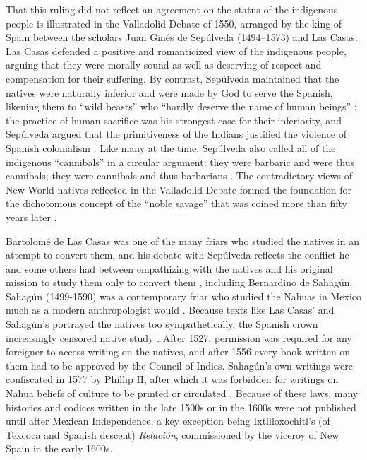 That this ruling did not reflect an agreement on the status of the indigenous people is illustrated in the Valladolid Debate of 1550, arranged by the king of Spain between the scholars Juan Ginés de Sepúlveda (1494–1573) and Las Casas. Las Casas defended a positive and romanticized view of the indigenous people, arguing that they were morally sound as well as deserving of respect and compensation for their suffering. By contrast, Sepúlveda maintained that the natives were naturally inferior and were made by God to serve the Spanish, likening them to “wild beasts” who “hardly deserve the name of human beings” \parencite[107,132]{Restall2003}; 
the practice of human sacrifice was his strongest case for their inferiority, and Sepúlveda argued that the primitiveness of the Indians justified the violence of Spanish colonialism \parencites[32-33]{Swarthout2004}[186]{Todorov1984}. 
Like many at the time, Sepúlveda also called all of the indigenous “cannibals” in a circular argument: they were barbaric and were thus cannibals; they were cannibals and thus barbarians \parencite[107]{Restall2003}. 
The contradictory views of New World natives reflected in the Valladolid Debate formed the foundation for the dichotomous concept of the “noble savage” that was coined more than fifty years later \parencite[107]{Restall2003}.

Bartolomé de Las Casas was one of the many friars who studied the natives in an attempt to convert them, and his debate with Sepúlveda reflects the conflict he and some others had between empathizing with the natives and his original mission to study them only to convert them \parencite[201]{Todorov1984}, 
including Bernardino de Sahagún. Sahagún (1499-1590) was a contemporary friar who studied the Nahuas in Mexico much as a modern anthropologist would \parencite[9]{Leon2002}. 
Because texts like Las Casas’ and Sahagún’s portrayed the natives too sympathetically, the Spanish crown increasingly censored native study \parencite[162]{Diaz2005}. 
After 1527, permission was required for any foreigner to access writing on the natives, and after 1556 every book written on them had to be approved by the Council of Indies. Sahagún’s own writings were confiscated in 1577 by Phillip II, after which it was forbidden for writings on Nahua beliefs of culture to be printed or circulated \parencite[161-162]{Diaz2005}. 
Because of these laws, many histories and codices written in the late 1500s or in the 1600s were not published until after Mexican Independence, a key exception being Ixtliloxochitl’s (of Texcoca and Spanish descent) \emph{Relación}, commissioned by the viceroy of New Spain in the early 1600s. 

